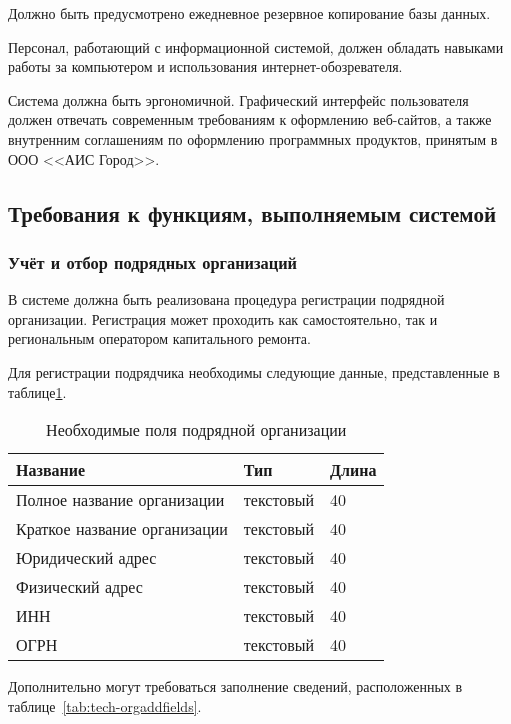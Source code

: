 Должно быть предусмотрено ежедневное резервное копирование базы данных.

Персонал, работающий с информационной системой, должен обладать навыками работы за компьютером и использования интернет-обозревателя.

Система должна быть эргономичной.
Графический интерфейс пользователя должен отвечать современным требованиям к оформлению веб-сайтов, а также внутренним соглашениям по оформлению программных продуктов, принятым в ООО <<АИС Город>>.

\subsection{Требования к функциям, выполняемым системой}

\subsubsection{Учёт и отбор подрядных организаций}

В системе должна быть реализована процедура регистрации подрядной организации.
Регистрация может проходить как самостоятельно, так и региональным оператором капитального ремонта.

Для регистрации подрядчика необходимы следующие данные, представленные в таблице\ref{tab:tech-orgfields}.

\begin{footnotesize}
\begin{longtable}[h]{|p{}|p{}|p{}|}
	\caption{\label{tab:tech-orgfields}Необходимые поля подрядной организации} \\
	\hline
		\textbf{Название} & \textbf{Тип} & \textbf{Длина} \\
	\hline
		Полное название организации & текстовый & 40 \\
	\hline
		Краткое название организации & текстовый & 40 \\
	\hline
		Юридический адрес & текстовый & 40 \\
	\hline
		Физический адрес & текстовый & 40 \\
	\hline
		ИНН & текстовый & 40 \\
	\hline
		ОГРН & текстовый & 40 \\
	\hline
\end{longtable}
\end{footnotesize}

Дополнительно могут требоваться заполнение сведений, расположенных в таблице~\ref{tab:tech-orgaddfields}.

